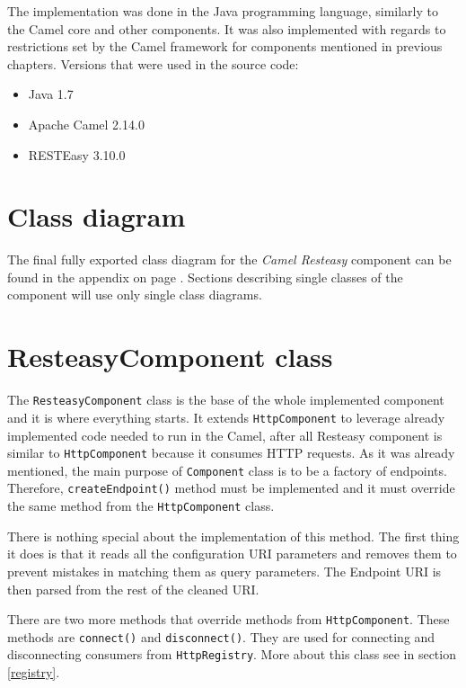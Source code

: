 \documentclass[12pt,final,oneside]{fithesis2}
\begin{document}
The implementation was done in the Java programming language, similarly to the Camel core and other components. It was also implemented with regards to restrictions set by the Camel framework for components mentioned in previous chapters. Versions that were used in the source code:
\begin{itemize}
\item
Java 1.7

\item
Apache Camel 2.14.0

\item
RESTEasy 3.10.0
\end{itemize}

\section{Class diagram}
The final fully exported class diagram for the \textit{Camel Resteasy} component can be found in the appendix on page \pageref{class-bla}. Sections describing single classes of the component will use only single class diagrams.

\section{ResteasyComponent class}
The \texttt{ResteasyComponent} class is the base of the whole implemented component and it is where everything starts. It extends \texttt{HttpComponent} to leverage already implemented code needed to run in the Camel, after all Resteasy component is similar to \texttt{HttpComponent} because it consumes HTTP requests. As it was already mentioned, the main purpose of \texttt{Component} class is to be a factory of endpoints. Therefore, \texttt{createEndpoint()} method must be implemented and it must override the same method from the \texttt{HttpComponent} class.

There is nothing special about the implementation of this method. The first thing it does is that it reads all the configuration URI parameters and removes them to prevent mistakes in matching them as query parameters. The Endpoint URI is then parsed from the rest of the cleaned URI.

There are two more methods that override methods from \texttt{HttpCom\-ponent}. These methods are \texttt{connect()} and \texttt{disconnect()}. They are used for connecting and disconnecting consumers from \texttt{HttpRegistry}. More about this class see in section \ref{registry}. 
\end{document}
